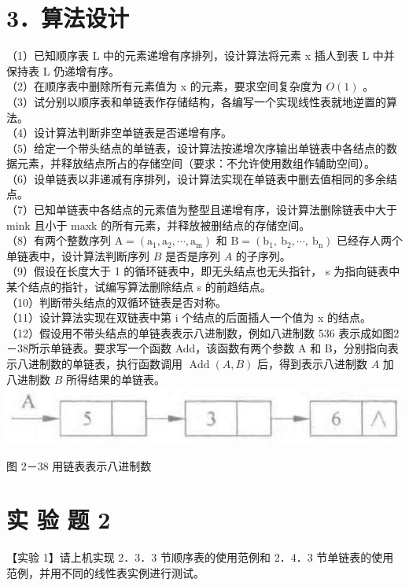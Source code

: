 \documentclass[10pt]{article}
\begin{document}
\section*{3．算法设计}
（1）已知顺序表 L 中的元素递增有序排列，设计算法将元素 x 插人到表 L 中并保持表 L 仍递增有序。\\
（2）在顺序表中删除所有元素值为 x 的元素，要求空间复杂度为 $O(1)$ 。\\
（3）试分别以顺序表和单链表作存储结构，各编写一个实现线性表就地逆置的算法。\\
（4）设计算法判断非空单链表是否递增有序。\\
（5）给定一个带头结点的单链表，设计算法按递增次序输出单链表中各结点的数据元素，并释放结点所占的存储空间（要求：不允许使用数组作辅助空间）。\\
（6）设单链表以非递减有序排列，设计算法实现在单链表中删去值相同的多余结点。\\
（7）已知单链表中各结点的元素值为整型且递增有序，设计算法删除链表中大于 mink 且小于 maxk 的所有元素，并释放被删结点的存储空间。\\
（8）有两个整数序列 $\mathrm{A}=\left(\mathrm{a}_{1}, \mathrm{a}_{2}, \cdots, \mathrm{a}_{\mathrm{m}}\right)$ 和 $\mathrm{B}=\left(\mathrm{b}_{1}, \mathrm{~b}_{2}, \cdots, \mathrm{~b}_{\mathrm{n}}\right)$ 已经存人两个单链表中，设计算法判断序列 $B$ 是否是序列 $A$ 的子序列。\\
（9）假设在长度大于 1 的循环链表中，即无头结点也无头指针， s 为指向链表中某个结点的指针，试编写算法删除结点 s 的前趋结点。\\
（10）判断带头结点的双循环链表是否对称。\\
（11）设计算法实现在双链表中第 i 个结点的后面插人一个值为 x 的结点。\\
（12）假设用不带头结点的单链表表示八进制数，例如八进制数 536 表示成如图2－38所示单链表。要求写一个函数 Add，该函数有两个参数 A 和 B，分别指向表示八进制数的单链表，执行函数调用 $\operatorname{Add}(A, B)$ 后，得到表示八进制数 $A$ 加八进制数 $B$ 所得结果的单链表。\\
\includegraphics[max width=\textwidth, center]{2025_06_06_704745ea57b15b2333e5g-080}

图 2－38 用链表表示八进制数

\section*{实 验 题 2}
【实验 1】请上机实现 2．3．3 节顺序表的使用范例和 2．4．3 节单链表的使用范例，并用不同的线性表实例进行测试。
\end{document}
